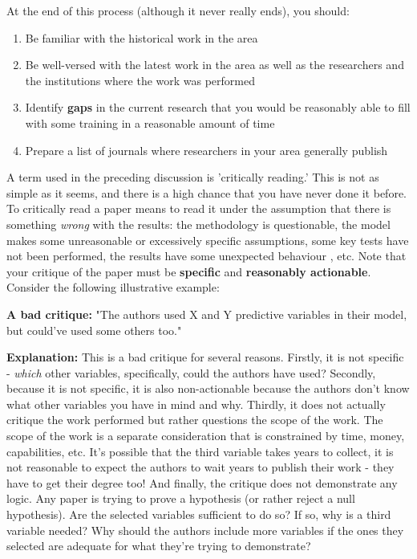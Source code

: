 \documentclass[12pt]{article}
\begin{document}
At the end of this process (although it never really ends), you should:

\begin{enumerate}
	\item Be familiar with the historical work in the area
	\item Be well-versed with the latest work in the area as well as the researchers and the institutions where the work was performed
	\item Identify \textbf{gaps} in the current research that you would be reasonably able to fill with some training in a reasonable amount of time
	\item Prepare a list of journals where researchers in your area generally publish
\end{enumerate}

A term used in the preceding discussion is 'critically reading.' This is not as simple as it seems, and there is a high chance that you have never done it before. To critically read a paper means to read it under the assumption that there is something \textit{wrong} with the results: the methodology is questionable, the model makes some unreasonable or excessively specific assumptions, some key tests have not been performed, the results have some unexpected behaviour , etc. Note that your critique of the paper must be \textbf{specific} and \textbf{reasonably actionable}. Consider the following illustrative example:

\textbf{A bad critique:} "The authors used X and Y predictive variables in their model, but could've used some others too."

\textbf{Explanation:} This is a bad critique for several reasons. Firstly, it is not specific - \textit{which} other variables, specifically, could the authors have used? Secondly, because it is not specific, it is also non-actionable because the authors don't know what other variables you have in mind and why. Thirdly, it does not actually critique the work performed but rather questions the scope of the work. The scope of the work is a separate consideration that is constrained by time, money, capabilities, etc. It's possible that the third variable takes years to collect, it is not reasonable to expect the authors to wait years to publish their work - they have to get their degree too! And finally, the critique does not demonstrate any logic. Any paper is trying to prove a hypothesis (or rather reject a null hypothesis). Are the selected variables sufficient to do so? If so, why is a third variable needed? Why should the authors include more variables if the ones they selected are adequate for what they're trying to demonstrate?
\end{document}
